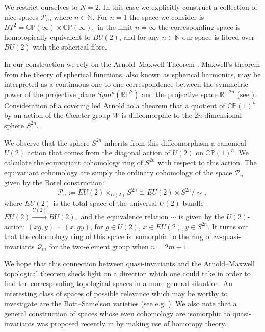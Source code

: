 \documentclass[11pt]{amsart}
\theoremstyle{definition}
\theoremstyle{remark}
\numberwithin{equation}{section}
\newcommand{\CP}{\mathbb{CP}}
\newcommand{\RP}{\mathbb{RP}}
\begin{document}
We restrict ourselves to $N=2$. In this case we explicitly construct a collection of nice spaces $\mathcal P_n$, where $n \in \mathbb N$.
For $n=1$ the space we consider is $BT^2 = {\CP}(\infty)\times {\CP}(\infty),$ in the limit $n= \infty$ the corresponding space is homotopically equivalent to $BU(2)$, and for any $n\in \mathbb N$ our space is fibred over $BU(2)$ with the spherical fibre.

In our construction we rely on the Arnold--Maxwell Theorem \cite{Arnold1996}. Maxwell's theorem from the theory of spherical functions, also known as spherical harmonics, may be interpreted as a continuous one-to-one correspondence between the symmetric power of the projective plane $Sym^n ({\RP}^2)$ and the projective space ${\RP}^{2n}$ (see \cite{Arnold1996}). Consideration of a covering led Arnold to a theorem that a quotient of $\CP(1)^n$ 
by an action of the Coxeter group $W$  is diffeomorphic to the $2n$-dimensional sphere $S^{2n}$. 

We observe  that the sphere $S^{2n}$ inherits from this diffeomorphism a canonical $U(2)$ action that comes from the diagonal action of $U(2)$ on $\CP(1)^n$.
We calculate the equivariant cohomology ring of $S^{2n}$ with respect to this action. The equivariant cohomology are simply the ordinary cohomology of the space ${\mathcal P}_n$ given by the Borel construction:
\[
{\mathcal P}_n := EU(2) \times_{U(2)}S^{2n} \cong EU(2) \times S^{2n}/\!\sim,
\]
where $EU(2)$ is the total space of the universal $U(2)$-bundle $EU(2) \xrightarrow{U(2)} BU(2),$ and the equivalence relation $\sim$ is given by the $U(2)$-action: $(xg,y)\sim(x,gy)$, for $g \in U(2)$,
$x \in EU(2), y \in S^{2n}$. %
It turns out that the cohomology ring of this space is isomorphic to the ring of $m$-quasi-invariants $\mathcal{Q}_m$ for the two-element group when $n=2m+1$.

We hope that this connection between quasi-invariants and the Arnold--Maxwell topological theorem sheds light on a direction which one could take in order to find the corresponding topological spaces in a more general situation. An interesting class of spaces of possible relevance which may be worthy to investigate are the Bott--Samelson varieties (see e.g. \cite{AF23}). We also note that a general construction of spaces whose even cohomology are isomorphic to quasi-invariants was proposed recently in \cite{BLR} by making use of homotopy theory.
\end{document}
